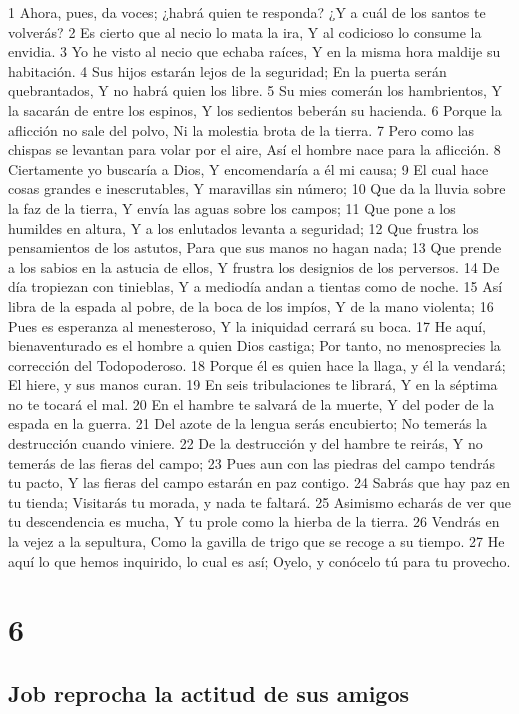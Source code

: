 1 Ahora, pues, da voces; ¿habrá quien te responda?
¿Y a cuál de los santos te volverás?
2 Es cierto que al necio lo mata la ira,
Y al codicioso lo consume la envidia.
3 Yo he visto al necio que echaba raíces,
Y en la misma hora maldije su habitación.
4 Sus hijos estarán lejos de la seguridad;
En la puerta serán quebrantados,
Y no habrá quien los libre.
5 Su mies comerán los hambrientos,
Y la sacarán de entre los espinos,
Y los sedientos beberán su hacienda.
6 Porque la aflicción no sale del polvo,
Ni la molestia brota de la tierra.
7 Pero como las chispas se levantan para volar por el aire,
Así el hombre nace para la aflicción.
8 Ciertamente yo buscaría a Dios,
Y encomendaría a él mi causa;
9 El cual hace cosas grandes e inescrutables,
Y maravillas sin número;
10 Que da la lluvia sobre la faz de la tierra,
Y envía las aguas sobre los campos;
11 Que pone a los humildes en altura,
Y a los enlutados levanta a seguridad;
12 Que frustra los pensamientos de los astutos,
Para que sus manos no hagan nada;
13 Que prende a los sabios en la astucia de ellos, 
Y frustra los designios de los perversos.
14 De día tropiezan con tinieblas,
Y a mediodía andan a tientas como de noche.
15 Así libra de la espada al pobre, de la boca de los impíos,
Y de la mano violenta;
16 Pues es esperanza al menesteroso,
Y la iniquidad cerrará su boca.
17 He aquí, bienaventurado es el hombre a quien Dios castiga;
Por tanto, no menosprecies la corrección del Todopoderoso. 
18 Porque él es quien hace la llaga, y él la vendará;
El hiere, y sus manos curan.
19 En seis tribulaciones te librará,
Y en la séptima no te tocará el mal.
20 En el hambre te salvará de la muerte,
Y del poder de la espada en la guerra.
21 Del azote de la lengua serás encubierto;
No temerás la destrucción cuando viniere.
22 De la destrucción y del hambre te reirás,
Y no temerás de las fieras del campo;
23 Pues aun con las piedras del campo tendrás tu pacto,
Y las fieras del campo estarán en paz contigo.
24 Sabrás que hay paz en tu tienda;
Visitarás tu morada, y nada te faltará.
25 Asimismo echarás de ver que tu descendencia es mucha,
Y tu prole como la hierba de la tierra.
26 Vendrás en la vejez a la sepultura,
Como la gavilla de trigo que se recoge a su tiempo.
27 He aquí lo que hemos inquirido, lo cual es así;
Oyelo, y conócelo tú para tu provecho.

\chapter{6}

\section*{Job reprocha la actitud de sus amigos}


